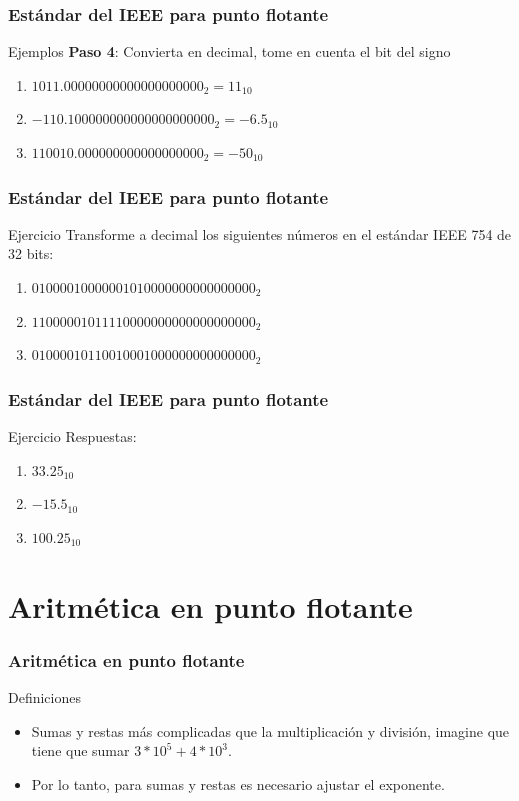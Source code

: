 \documentclass{beamer}
\begin{document}
\begin{frame}
	\frametitle{Estándar del IEEE para punto flotante}
	\begin{block}{Ejemplos}
	\textbf{Paso 4}: Convierta en decimal, tome en cuenta el bit del signo
	\begin{enumerate}
		\item $1011.00000000000000000000_{2}=11_{10}$
		\item $-110.100000000000000000000_{2}=-6.5_{10}$
		\item $110010.000000000000000000_{2}=-50_{10}$
	\end{enumerate}		
	\end{block}
\end{frame}

\begin{frame}
	\frametitle{Estándar del IEEE para punto flotante}
	\begin{block}{Ejercicio}
	Transforme a decimal los siguientes números en el estándar IEEE 754 de 32 bits:
	\begin{enumerate}
		\item $01000010000001010000000000000000_{2}$
		\item $11000001011110000000000000000000_{2}$
		\item $01000010110010001000000000000000_{2}$
	\end{enumerate}	
	\end{block}
\end{frame}

\begin{frame}
	\frametitle{Estándar del IEEE para punto flotante}
	\begin{block}{Ejercicio}
	Respuestas:
	\begin{enumerate}
		\item $33.25_{10}$
		\item $-15.5_{10}$
		\item $100.25_{10}$
	\end{enumerate}	
	\end{block}
\end{frame}

\section{Aritmética en punto flotante}

\begin{frame}
	\frametitle{Aritmética en punto flotante}
	\begin{block}{Definiciones}
	\begin{itemize}
		\item Sumas y restas más complicadas que la multiplicación y división, imagine que tiene que sumar $3*10^{5}+4*10^{3}$.
		\item Por lo tanto, para sumas y restas es necesario ajustar el exponente.
	\end{itemize}	
	\end{block}
\end{frame}
\end{document}
